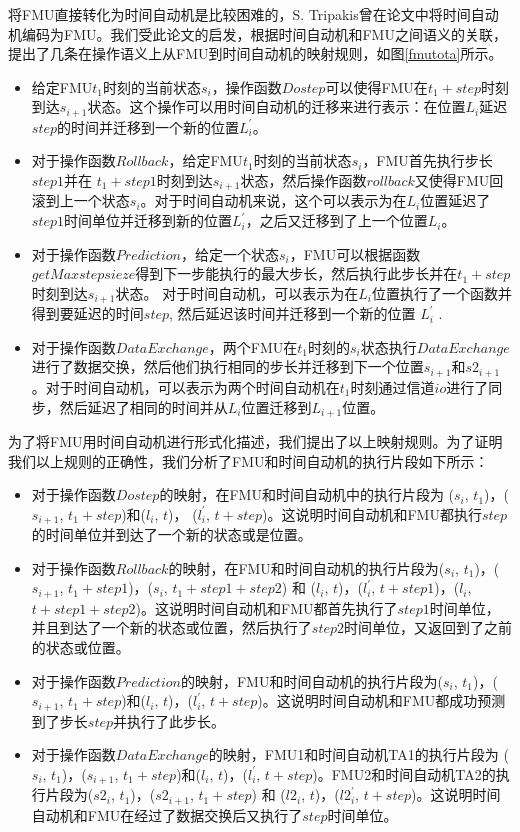 将FMU直接转化为时间自动机是比较困难的，S. Tripakis曾在论文\cite{Tripakis15}中将时间自动机编码为FMU。我们受此论文的启发，根据时间自动机和FMU之间语义的关联，提出了几条在操作语义上从FMU到时间自动机的映射规则，如图\ref{fmutota}所示。
\begin{itemize}
\item
给定FMU$t_{1}$时刻的当前状态$s_{i}$，操作函数$Dostep$可以使得FMU在$t_{1}+step$时刻到达$s_{i+1}$状态。这个操作可以用时间自动机的迁移来进行表示：在位置$L_{i}$延迟$step$的时间并迁移到一个新的位置$L_{i}^{\prime}$。
\item
对于操作函数$Rollback$，给定FMU$t_{1}$时刻的当前状态$s_{i}$，FMU首先执行步长$step1$并在 $t_{1}+step1$时刻到达$s_{i+1}$状态，然后操作函数$rollback$又使得FMU回滚到上一个状态$s_{i}$。对于时间自动机来说，这个可以表示为在$L_{i}$位置延迟了$step1$时间单位并迁移到新的位置$L_{i}^{\prime}$，之后又迁移到了上一个位置$L_{i}$。 
\item
对于操作函数$Prediction$，给定一个状态$s_{i}$，FMU可以根据函数$getMaxstepsieze$得到下一步能执行的最大步长，然后执行此步长并在$t_{1}+step$时刻到达$s_{i+1}$状态。 对于时间自动机，可以表示为在$L_{i}$位置执行了一个函数并得到要延迟的时间$step$, 然后延迟该时间并迁移到一个新的位置 $L_{i}^{\prime}$ .
\item
对于操作函数$Data Exchange$，两个FMU在$t_{1}$时刻的$s_{i}$状态执行$Data Exchange$进行了数据交换，然后他们执行相同的步长并迁移到下一个位置$s_{i+1}$和$s2_{i+1}$。对于时间自动机，可以表示为两个时间自动机在$t_{1}$时刻通过信道$io$进行了同步，然后延迟了相同的时间并从$L_{i}$位置迁移到$L_{i+1}$位置。
\end{itemize}
为了将FMU用时间自动机进行形式化描述，我们提出了以上映射规则。为了证明我们以上规则的正确性，我们分析了FMU和时间自动机的执行片段如下所示：
\begin{itemize}
\item
对于操作函数$Dostep$的映射，在FMU和时间自动机中的执行片段为 ($s_{i}$, $t_{1}$)，($s_{i+1}$, $t_{1}+step$)和($l_{i}$, $t$)， ($l_{i}^{\prime}$, $t+step$)。这说明时间自动机和FMU都执行$step$的时间单位并到达了一个新的状态或是位置。
\item 
对于操作函数$Rollback$的映射，在FMU和时间自动机的执行片段为($s_{i}$, $t_{1}$)，($s_{i+1}$, $t_{1}+step1$)，($s_{i}$, $t_{1}+step1+step2$) 和 ($l_{i}$, $t$)，($l_{i}^{\prime}$, $t+step1$)，($l_{i}$, $t+step1+step2$)。这说明时间自动机和FMU都首先执行了$step1$时间单位，并且到达了一个新的状态或位置，然后执行了$step2$时间单位，又返回到了之前的状态或位置。
\item
对于操作函数$Prediction$的映射，FMU和时间自动机的执行片段为($s_{i}$, $t_{1}$)，($s_{i+1}$, $t_{1}+step$)和($l_{i}$, $t$)，($l_{i}^{\prime}$, $t+step$)。这说明时间自动机和FMU都成功预测到了步长$step$并执行了此步长。
\item
对于操作函数$Data Exchange$的映射，FMU1和时间自动机TA1的执行片段为 ($s_{i}$, $t_{1}$)，($s_{i+1}$, $t_{1}+step$)和($l_{i}$, $t$)，($l_{i}^{\prime}$, $t+step$)。FMU2和时间自动机TA2的执行片段为($s2_{i}$, $t_{1}$)，($s2_{i+1}$, $t_{1}+step$) 和 ($l2_{i}$, $t$)，($l2_{i}^{\prime}$, $t+step$)。这说明时间自动机和FMU在经过了数据交换后又执行了$step$时间单位。
\end{itemize}
